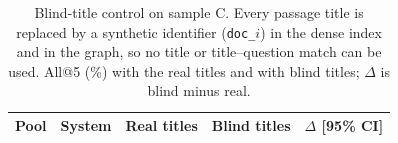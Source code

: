 \begin{table}[t]
\centering
\small
\caption{Blind-title control on sample C. Every passage title is replaced by a synthetic identifier (\texttt{doc\_$i$}) in the dense index and in the graph, so no title or title--question match can be used. All@5 (\%) with the real titles and with blind titles; $\Delta$ is blind minus real.}
\label{tab:blind}
\begin{tabular}{llrrr}
\toprule
Pool & System & Real titles & Blind titles & $\Delta$ [95\% CI] \\
\midrule
\bottomrule
\end{tabular}
\end{table}
